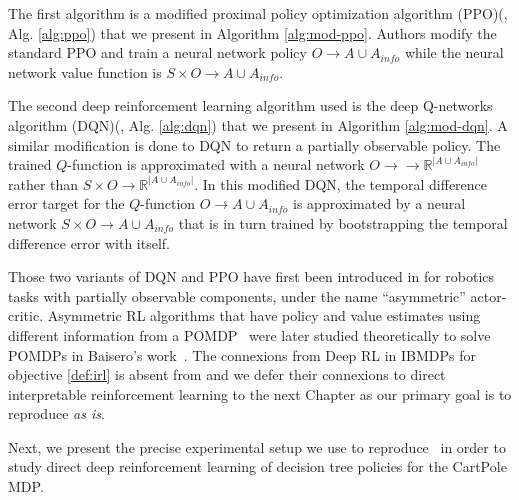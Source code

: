The first algorithm is a modified proximal policy optimization algorithm (PPO)(\cite{ppo}, Alg. \ref{alg:ppo}) that we present in Algorithm \ref{alg:mod-ppo}.
Authors modify the standard PPO and train a neural network policy $O\rightarrow A\cup A_{info}$ while the neural network value function is $S\times O\rightarrow A\cup A_{info}$.

The second deep reinforcement learning algorithm used is the deep Q-networks algorithm (DQN)(\cite{dqn}, Alg. \ref{alg:dqn}) that we present in Algorithm \ref{alg:mod-dqn}.
A similar modification is done to DQN to return a partially observable policy. The trained $Q$-function is approximated with a neural network $O\rightarrow \rightarrow \mathbb{R}^{|A\cup A_{info}|}$ rather than $S\times O\rightarrow \mathbb{R}^{|A\cup A_{info}|}$.
In this modified DQN, the temporal difference error target for the $Q$-function $O\rightarrow A\cup A_{info}$ is approximated by a neural network $S\times O\rightarrow A\cup A_{info}$ that is in turn trained by bootstrapping the temporal difference error with itself.

Those two variants of DQN and PPO have first been introduced in \cite{pinto} for robotics tasks with partially observable components, under the name ``asymmetric'' actor-critic. 
Asymmetric RL algorithms that have policy and value estimates using different information from a POMDP~\cite{POMDP,chap2} were later studied theoretically to solve POMDPs in Baisero's work~\cite{baisero-dqn,baisero-ppo}.
The connexions from Deep RL in IBMDPs for objective \ref{def:irl} is absent from \cite{topin2021iterative} and we defer their connexions to direct interpretable reinforcement learning to the next Chapter as our primary goal is to reproduce \cite{topin2021iterative} \textit{as is}.

Next, we present the precise experimental setup we use to reproduce~\cite[Table 1]{topin2021iterative} in order to study direct deep reinforcement learning of decision tree policies for the CartPole MDP.

